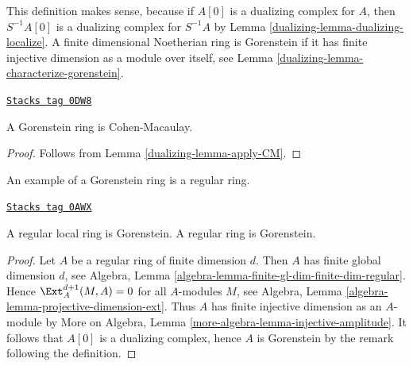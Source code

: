 This definition makes sense, because if $A[0]$ is a dualizing complex
for $A$, then $S^{-1}A[0]$ is a dualizing complex for $S^{-1}A$ by
Lemma \ref{dualizing-lemma-dualizing-localize}.
A finite dimensional Noetherian ring is Gorenstein
if it has finite injective dimension as a module over itself, see
Lemma \ref{dualizing-lemma-characterize-gorenstein}.

\begin{lemma}[Gorenstein CM]
\label{dualizing-lemma-gorenstein-CM}
\href{https://stacks.math.columbia.edu/tag/0DW8}{\texttt{Stacks tag 0DW8}}

A Gorenstein ring is Cohen-Macaulay.
\end{lemma}

\begin{proof}

Follows from Lemma \ref{dualizing-lemma-apply-CM}.
\end{proof}

An example of a Gorenstein ring is a regular ring.

\begin{lemma}
\label{dualizing-lemma-regular-gorenstein}
\href{https://stacks.math.columbia.edu/tag/0AWX}{\texttt{Stacks tag 0AWX}}

A regular local ring is Gorenstein.
A regular ring is Gorenstein.
\end{lemma}

\begin{proof}
Let $A$ be a regular ring of finite dimension $d$. Then $A$ has finite
global dimension $d$, see
Algebra, Lemma \ref{algebra-lemma-finite-gl-dim-finite-dim-regular}.
Hence $\Ext^{d + 1}_A(M, A) = 0$ for all $A$-modules $M$, see
Algebra, Lemma \ref{algebra-lemma-projective-dimension-ext}.
Thus $A$ has finite injective dimension as an $A$-module by
More on Algebra, Lemma \ref{more-algebra-lemma-injective-amplitude}.
It follows that $A[0]$ is a dualizing complex, hence $A$ is
Gorenstein by the remark following the definition.
\end{proof}

